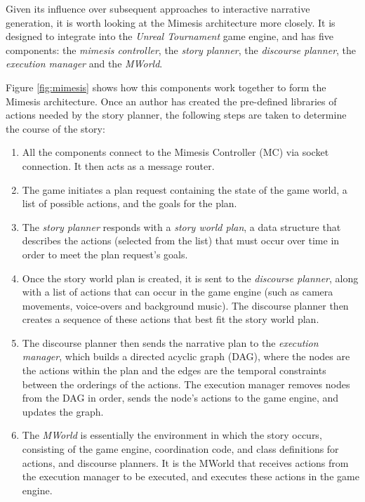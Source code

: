 Given its influence over subsequent approaches to interactive narrative
generation, it is worth looking at the Mimesis architecture more closely.
It is designed to integrate into the \emph{Unreal
  Tournament} game engine, and has five components: the \emph{mimesis
  controller}, the \emph{story planner}, the \emph{discourse planner}, the
\emph{execution manager} and the \emph{MWorld}.

Figure \ref{fig:mimesis} shows how this components work together to form the
Mimesis architecture. Once an author has created the pre-defined libraries of
actions needed by the story planner, the following steps are taken to determine
the course of the story:

\begin{enumerate}
  \item All the components connect to the Mimesis Controller (MC) via socket
    connection. It then acts as a message router.
  \item The game initiates a plan request containing the state of the game
    world, a list of possible actions, and the goals for the plan.
  \item The \emph{story planner} responds with a \emph{story world plan}, a data
    structure that describes the actions (selected from the list) that must occur over time in order to
    meet the plan request's goals.
  \item Once the story world plan is created, it is sent to the \emph{discourse
      planner}, along with a list of actions that can occur in the game engine
    (such as camera movements, voice-overs and background
    music). The discourse planner then creates a sequence of these actions that
    best fit the story world plan.
  \item The discourse planner then sends the narrative plan to the
    \emph{execution manager}, which builds a directed acyclic graph (DAG), where
    the nodes are the actions within the plan and the edges are the temporal
    constraints between the orderings of the actions. The execution manager
    removes nodes from the DAG in order, sends the node's actions to the
    game engine, and updates the graph.
  \item The \emph{MWorld} is essentially the environment in which the story
    occurs, consisting of the game engine, coordination code, and class
    definitions for actions, and discourse planners. It is the MWorld that
    receives actions from the execution manager to be executed, and executes
    these actions in the game engine.
\end{enumerate}

